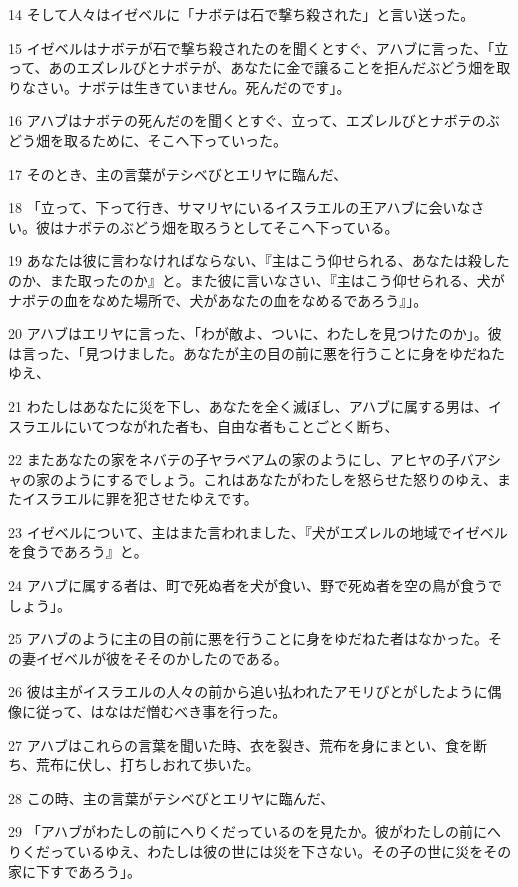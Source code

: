 \par 14 そして人々はイゼベルに「ナボテは石で撃ち殺された」と言い送った。
\par 15 イゼベルはナボテが石で撃ち殺されたのを聞くとすぐ、アハブに言った、「立って、あのエズレルびとナボテが、あなたに金で譲ることを拒んだぶどう畑を取りなさい。ナボテは生きていません。死んだのです」。
\par 16 アハブはナボテの死んだのを聞くとすぐ、立って、エズレルびとナボテのぶどう畑を取るために、そこへ下っていった。
\par 17 そのとき、主の言葉がテシベびとエリヤに臨んだ、
\par 18 「立って、下って行き、サマリヤにいるイスラエルの王アハブに会いなさい。彼はナボテのぶどう畑を取ろうとしてそこへ下っている。
\par 19 あなたは彼に言わなければならない、『主はこう仰せられる、あなたは殺したのか、また取ったのか』と。また彼に言いなさい、『主はこう仰せられる、犬がナボテの血をなめた場所で、犬があなたの血をなめるであろう』」。
\par 20 アハブはエリヤに言った、「わが敵よ、ついに、わたしを見つけたのか」。彼は言った、「見つけました。あなたが主の目の前に悪を行うことに身をゆだねたゆえ、
\par 21 わたしはあなたに災を下し、あなたを全く滅ぼし、アハブに属する男は、イスラエルにいてつながれた者も、自由な者もことごとく断ち、
\par 22 またあなたの家をネバテの子ヤラベアムの家のようにし、アヒヤの子バアシャの家のようにするでしょう。これはあなたがわたしを怒らせた怒りのゆえ、またイスラエルに罪を犯させたゆえです。
\par 23 イゼベルについて、主はまた言われました、『犬がエズレルの地域でイゼベルを食うであろう』と。
\par 24 アハブに属する者は、町で死ぬ者を犬が食い、野で死ぬ者を空の鳥が食うでしょう」。
\par 25 アハブのように主の目の前に悪を行うことに身をゆだねた者はなかった。その妻イゼベルが彼をそそのかしたのである。
\par 26 彼は主がイスラエルの人々の前から追い払われたアモリびとがしたように偶像に従って、はなはだ憎むべき事を行った。
\par 27 アハブはこれらの言葉を聞いた時、衣を裂き、荒布を身にまとい、食を断ち、荒布に伏し、打ちしおれて歩いた。
\par 28 この時、主の言葉がテシベびとエリヤに臨んだ、
\par 29 「アハブがわたしの前にへりくだっているのを見たか。彼がわたしの前にへりくだっているゆえ、わたしは彼の世には災を下さない。その子の世に災をその家に下すであろう」。

